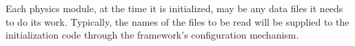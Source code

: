 \documentclass[draftmode,draftwater]{memarticle}
\begin{document}
Each physics module, at the time it is initialized, may be any data
files it needs to do its work. Typically, the names of the files to be
read will be supplied to the initialization code through the
framework's configuration mechanism.


\end{document}
